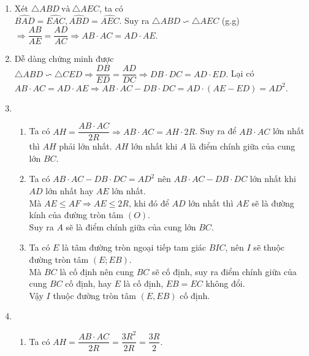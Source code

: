 \begin{bt}
{\begin{enumerate}
			Lại có $\widehat{IBE}= \widehat{CBE}+ \widehat{CBI}$,\\
			Mà $\widehat{ABI}= \widehat{CBI}$ (do $BI$ là phân giác của $\widehat{ABC}$),\\
			$\widehat{CBE}= \widehat{EAC}= \widehat{BAI}$.\\
			Suy ra $\widehat{EBI}= \widehat{EIB} \Rightarrow \triangle EBI$ cân tại $I$. Hay $EI= EB \Rightarrow EB= EC= EI$, suy ra $E$ là tâm đường tròn ngoại tiếp tam giác $BIC$.
			\item Xét $\triangle ABD\ \text{và}\ \triangle AEC$, ta có\\
			$\widehat{BAD}= \widehat{EAC}, \widehat{ABD}= \widehat{AEC}$.
			Suy ra $\triangle ABD \backsim \triangle AEC$ (g.g)\\
			$\Rightarrow \dfrac{AB}{AE}= \dfrac{AD}{AC} \Rightarrow AB \cdot AC= AD \cdot AE.$
			\item Dễ dàng chứng minh được $\triangle ABD \backsim \triangle CED \Rightarrow \dfrac{DB}{ED}= \dfrac{AD}{DC} \Rightarrow DB \cdot DC= AD \cdot ED.$
			Lại có $AB \cdot AC= AD \cdot AE \Rightarrow AB \cdot AC- DB \cdot DC= AD \cdot (AE- ED)= AD^2.$
			\item 	\begin{enumerate}[1)]
				\item Ta có $AH= \dfrac{AB \cdot AC}{2R} \Rightarrow AB \cdot AC= AH \cdot 2R$. Suy ra để $AB \cdot AC$ lớn nhất thì $AH$ phải lớn nhất. $AH$ lớn nhất khi $A$ là điểm chính giữa của cung lớn $BC$.
				\item Ta có $AB \cdot AC- DB \cdot DC= AD^2$ nên $AB \cdot AC- DB \cdot DC$ lớn nhất khi $AD$ lớn nhất hay $AE$ lớn nhất.\\
				Mà $AE \leq AF \Rightarrow AE \leq 2R$, khi đó để $AD$ lớn nhất thì $AE$ sẽ là đường kính của đường tròn tâm $(O)$.\\ Suy ra $A$ sẽ là điểm chính giữa của cung lớn $BC$.
				\item Ta có $E$ là tâm đường tròn ngoại tiếp tam giác $BIC$, nên $I$ sẽ thuộc đường tròn tâm $(E; EB)$.\\
				Mà $BC$ là cố định nên cung $BC$ sẽ cố định, suy ra điểm chính giữa của cung $BC$ cố định, hay $E$ là cố định, $EB= EC$ không đổi.\\
				Vậy $I$ thuộc đường tròn tâm $(E, EB)$ cố định.
			\end{enumerate}
			\item	\begin{enumerate}[1)]
				\item Ta có $AH= \dfrac{AB \cdot AC}{2R}= \dfrac{3R^2}{2R}= \dfrac{3R}{2}$.\\

\end{enumerate}
\end{enumerate}}
\end{bt}
